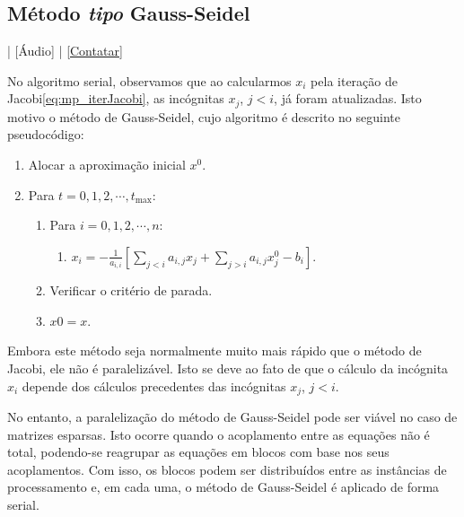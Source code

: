 

\subsection{Método {\it tipo} Gauss-Seidel}\label{subsec:mp_mitsislin_GS}

\begin{flushright}
  [Vídeo] | [Áudio] | \href{https://phkonzen.github.io/notas/contato.html}{[Contatar]}
\end{flushright}

No algoritmo serial, observamos que ao calcularmos $x_i$ pela iteração de Jacobi\eqref{eq:mp_iterJacobi}, as incógnitas $x_j$, $j<i$, já foram atualizadas. Isto motivo o método de Gauss-Seidel, cujo algoritmo é descrito no seguinte pseudocódigo:
\begin{enumerate}
\item Alocar a aproximação inicial $x^0$.
\item Para $t=0,1,2,\cdots,t_{\text{max}}$:
  \begin{enumerate}
  \item Para $i=0,1,2,\cdots,n$:
    \begin{enumerate}
    \item $\displaystyle x_i = -\frac{1}{a_{i,i}}\left[\sum_{j<i}a_{i,j}x_j + \sum_{j>i}a_{i,j}x^0_j - b_i\right]$.
    \end{enumerate}
  \item Verificar o critério de parada.
  \item $x0 = x$.
  \end{enumerate}
\end{enumerate}

Embora este método seja normalmente muito mais rápido que o método de Jacobi, ele não é paralelizável. Isto se deve ao fato de que o cálculo da incógnita $x_i$ depende dos cálculos precedentes das incógnitas $x_j$, $j<i$.

No entanto, a paralelização do método de Gauss-Seidel pode ser viável no caso de matrizes esparsas. Isto ocorre quando o acoplamento entre as equações não é total, podendo-se reagrupar as equações em blocos com base nos seus acoplamentos. Com isso, os blocos podem ser distribuídos entre as instâncias de processamento e, em cada uma, o método de Gauss-Seidel é aplicado de forma serial.


